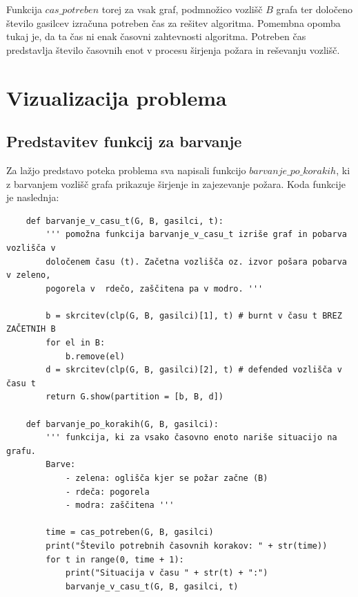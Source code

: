 \documentclass[a4paper, 12pt]{article}
\begin{document}
\noindent Funkcija $cas\_potreben$ torej za vsak graf, podmnožico vozlišč $B$ grafa ter določeno število gasilcev
izračuna potreben čas za rešitev algoritma. Pomembna opomba tukaj je, da ta čas ni enak časovni zahtevnosti
algoritma. Potreben čas predstavlja število časovnih enot v procesu širjenja požara in reševanju vozlišč.

\pagebreak


\section{Vizualizacija problema}

\subsection{Predstavitev funkcij za barvanje}

\noindent Za lažjo predstavo poteka problema sva napisali funkcijo $barvanje\_po\_korakih$, ki z barvanjem
vozlišč grafa prikazuje širjenje in zajezevanje požara. Koda funkcije je naslednja:

\begin{scriptsize}
\begin{verbatim}
    def barvanje_v_casu_t(G, B, gasilci, t):
        ''' pomožna funkcija barvanje_v_casu_t izriše graf in pobarva vozlišča v 
        določenem času (t). Začetna vozlišča oz. izvor pošara pobarva v zeleno, 
        pogorela v  rdečo, zaščitena pa v modro. '''

        b = skrcitev(clp(G, B, gasilci)[1], t) # burnt v času t BREZ ZAČETNIH B
        for el in B:
            b.remove(el)
        d = skrcitev(clp(G, B, gasilci)[2], t) # defended vozlišča v času t
        return G.show(partition = [b, B, d])

    def barvanje_po_korakih(G, B, gasilci):
        ''' funkcija, ki za vsako časovno enoto nariše situacijo na grafu.
        Barve:
            - zelena: oglišča kjer se požar začne (B)
            - rdeča: pogorela
            - modra: zaščitena '''

        time = cas_potreben(G, B, gasilci)
        print("Število potrebnih časovnih korakov: " + str(time))
        for t in range(0, time + 1):
            print("Situacija v času " + str(t) + ":")
            barvanje_v_casu_t(G, B, gasilci, t) 
\end{verbatim}
\end{scriptsize}
\end{document}
